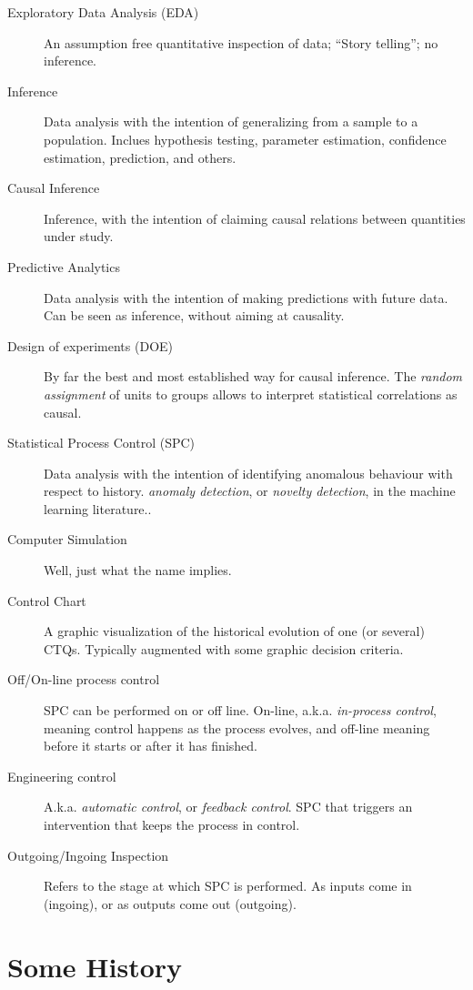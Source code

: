 \begin{tcolorbox}[breakable]
\begin{description}
\item [Exploratory Data Analysis (EDA)] An assumption free quantitative inspection of data; ``Story telling''; no inference.
\item [Inference] Data analysis with the intention of generalizing from a sample to a population. Inclues hypothesis testing, parameter estimation, confidence estimation, prediction, and others.
\item [Causal Inference] Inference, with the intention of claiming causal relations between quantities under study.
\item [Predictive Analytics] Data analysis with the intention of making predictions with future data. Can be seen as inference, without aiming at causality.
\item [Design of experiments (DOE)]  By far the best and most established way for causal inference. The \emph{random assignment} of units to groups allows to interpret statistical correlations as causal.
\item [Statistical Process Control (SPC)] Data analysis with the intention of identifying anomalous behaviour with respect to history. \Aka \emph{anomaly detection}, or \emph{novelty detection}, in the machine learning literature.. 
\item [Computer Simulation] Well, just what the name implies. 
\item [Control Chart] A graphic visualization of the historical evolution of one (or several) CTQs.  Typically augmented with some graphic decision criteria. 
\item [Off/On-line process control] SPC can be performed on or off line. 
On-line, a.k.a. \emph{in-process control},  meaning control happens as the process evolves, and off-line meaning before it starts or after it has finished.
\item [Engineering control] A.k.a. \emph{automatic control}, or \emph{feedback control}. SPC that triggers an intervention that keeps the process in control.
\item [Outgoing/Ingoing Inspection] Refers to the stage at which SPC is performed. As inputs come in (ingoing), or as outputs come out (outgoing). 
\end{description}
\end{tcolorbox}




\section{Some History}

